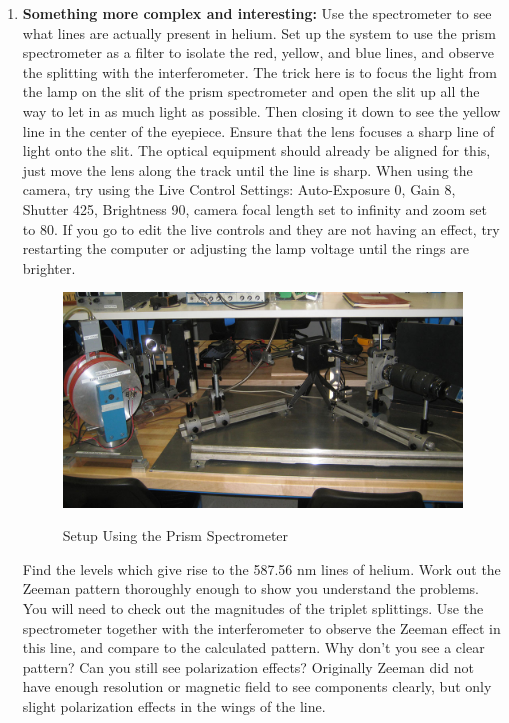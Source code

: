 \documentclass{../lab}
\begin{document}
\begin{enumerate}
    \item \textbf{Something more complex and interesting:} Use the spectrometer to see what lines are actually present in helium. Set up the system to use the prism spectrometer as a filter to isolate the red, yellow, and blue lines, and observe the splitting with the interferometer. The trick here is to focus the light from the lamp on the slit of the prism spectrometer and open the slit up all the way to let in as much light as possible. Then closing it down to see the yellow line in the center of the eyepiece. Ensure that the lens focuses a sharp line of light onto the slit. The optical equipment should already be aligned for this, just move the lens along the track until the line is sharp. When using the camera, try using the Live Control Settings: Auto-Exposure 0, Gain 8, Shutter 425, Brightness 90, camera focal length set to infinity and zoom set to 80. If you go to edit the live controls and they are not having an effect, try restarting the computer or adjusting the lamp voltage until the rings are brighter.
    
    \begin{figure}[H]
    \centering
        \href{http://experimentationlab.berkeley.edu/sites/default/files/images/ATM_Zeeman_3489-Crop-Lg.jpg}{\includegraphics[width=0.8\linewidth]{images/ATM_Zeeman_3489-Crop-Lg.jpg}} \\
        \caption{Setup Using the Prism Spectrometer}
        \label{PrismSpectrometer}
    \end{figure}
    
    Find the levels which give rise to the 587.56 nm lines of helium. Work out the Zeeman pattern thoroughly enough to show you understand the problems. You will need to check out the magnitudes of the triplet splittings. Use the spectrometer together with the interferometer to observe the Zeeman effect in this line, and compare to the calculated pattern. Why don't you see a clear pattern? Can you still see polarization effects? Originally Zeeman did not have enough resolution or magnetic field to see components clearly, but only slight polarization effects in the wings of the line.

\end{enumerate}
\end{document}
